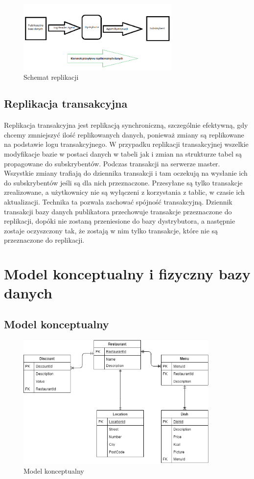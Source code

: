 \documentclass{article}
\begin{document}
	\begin{figure}[hbt!]
		\includegraphics[width=8cm]{Files/Pictures/ReplikacjaArchitektura}
		\centering
		\caption{Schemat replikacji}
	\end{figure}

	\subsection{Replikacja transakcyjna}
	\paragraph{} Replikacja transakcyjna jest replikacją synchroniczną, szczególnie efektywną, gdy chcemy zmniejszyć ilość replikowanych danych, ponieważ zmiany są replikowane na podstawie logu transakcyjnego. W przypadku replikacji transakcyjnej wszelkie modyfikacje bazie w postaci danych w tabeli jak i zmian na strukturze tabel są propagowane do subskrybentów. Podczas transakcji na serwerze master. Wszystkie zmiany trafiają do dziennika transakcji i tam oczekują na wysłanie ich do subskrybentów jeśli są dla nich przeznaczone. Przesyłane są tylko transakcje zrealizowane, a użytkownicy nie są wyłączeni z korzystania z tablic, w czasie ich aktualizacji. Technika ta pozwala zachować spójność transakcyjną. Dziennik transakcji bazy danych publikatora przechowuje transakcje przeznaczone do replikacji, dopóki nie zostaną przeniesione do bazy dystrybutora, a następnie zostaje oczyszczony tak, że zostają w nim tylko transakcje, które nie są przeznaczone do replikacji.
	
\newpage
\section{Model konceptualny i fizyczny bazy danych}
	\subsection{Model konceptualny}

\begin{figure}[hbt!]
				\includegraphics[width=10cm]{Files/Pictures/Model_K}
				\centering
				\caption{Model konceptualny}
			\end{figure}
\end{document}
